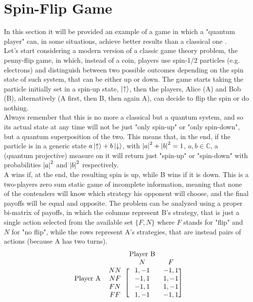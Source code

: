 \hfill

\section{Spin-Flip Game}
In this section it will be provided an example of a game in which a "quantum player" can, in some situations, achieve better results than a classical one \cite{invitation}.\\
Let's start considering a modern version of a classic game theory problem, the penny-flip game, in which, instead of a coin, players use spin-1/2 particles (e.g. electrons) and distinguish between two possible outcomes depending on the spin state of such system, that can be either up or down. The game starts taking the particle initially set in a spin-up state, $\ket{\uparrow}$, then the players, Alice (A) and Bob (B), alternatively (A first, then B, then again A), can decide to flip the spin or do nothing.\\
Always remember that this is no more a classical but a quantum system, and so its actual state at any time will not be just "only spin-up" or "only spin-down", but a quantum superposition of the two. This means that, in the end, if the particle is in a generic state $a\ket{\uparrow}+b\ket{\downarrow}$, with $\abs{a}^2 + \abs{b}^2 = 1$, $a,b\in\mathds{C}$, a (quantum projective) measure on it will return just "spin-up" or "spin-down" with probabilities $\abs{a}^2$ and $\abs{b}^2$ respectively.\\
A wins if, at the end, the resulting spin is up, while B wins if it is down. This is a two-players zero sum static game of incomplete information, meaning that none of the contenders will know which strategy his opponent will choose, and the final payoffs will be equal and opposite. The problem can be analyzed using a proper bi-matrix of payoffs, in which the columns represent B's strategy, that is just a single action selected from the available set $\{F,N\}$ where $F$ stands for "flip" and $N$ for "no flip", while the rows represent A's strategies, that are instead pairs of actions (because A has two turns). 
\[ \begin{blockarray}{cccc}
& & \text{Player B}&\\
& & N & F\\
\begin{block}{cc[cc]}
& NN &1,-1 &  -1,1 \\
\text{Player A} & NF & -1,1 & 1,-1 \\
& FN & -1,1 & 1,-1 \\
& FF & 1,-1 &  -1,1 \\
\end{block}
\end{blockarray} \]
